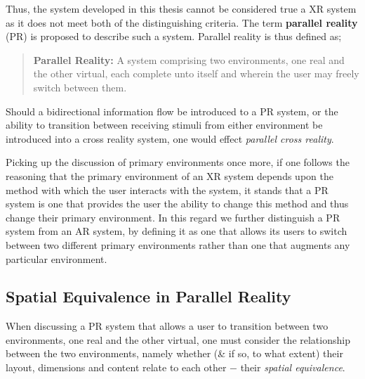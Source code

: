 Thus, the system developed in this thesis cannot be considered true a XR system as it does not meet both of the distinguishing criteria. The term \textbf{parallel reality} (PR\PRfootnote{}) is proposed to describe such a system. Parallel reality is thus defined as;

\begin{quote}
	\textbf{Parallel Reality:} A system comprising two environments, one real and the other virtual, each complete unto itself and wherein the user may freely switch between them.
\end{quote}

Should a bidirectional information flow be introduced to a PR system, or the ability to transition between receiving stimuli from either environment be introduced into a cross reality system, one would effect \textit{parallel cross reality}.

Picking up the discussion of primary environments once more, if one follows the reasoning that the primary environment of an XR system depends upon the method with which the user interacts with the system, it stands that a PR system is one that provides the user the ability to change this method and thus change their primary environment. In this regard we further distinguish a PR system from an AR system, by defining it as one that allows its users to switch between two different primary environments rather than one that augments any particular environment.


\subsection{Spatial Equivalence in Parallel Reality}

\label{spatial-equivalence}

\newcommand{\turklevrfootnote}{\footnote{\textit{``For virtual reality to be interesting it has to emulate the real. But you have to be able to do something in the virtual that you couldn't in the real.''}~\cite{Turkle1997}}}

When discussing a PR system that allows a user to transition between two environments, one real and the other virtual, one must consider the relationship between the two environments, namely whether (\& if so, to what extent) their layout, dimensions and content relate to each other $-$ their \textit{spatial equivalence}.

